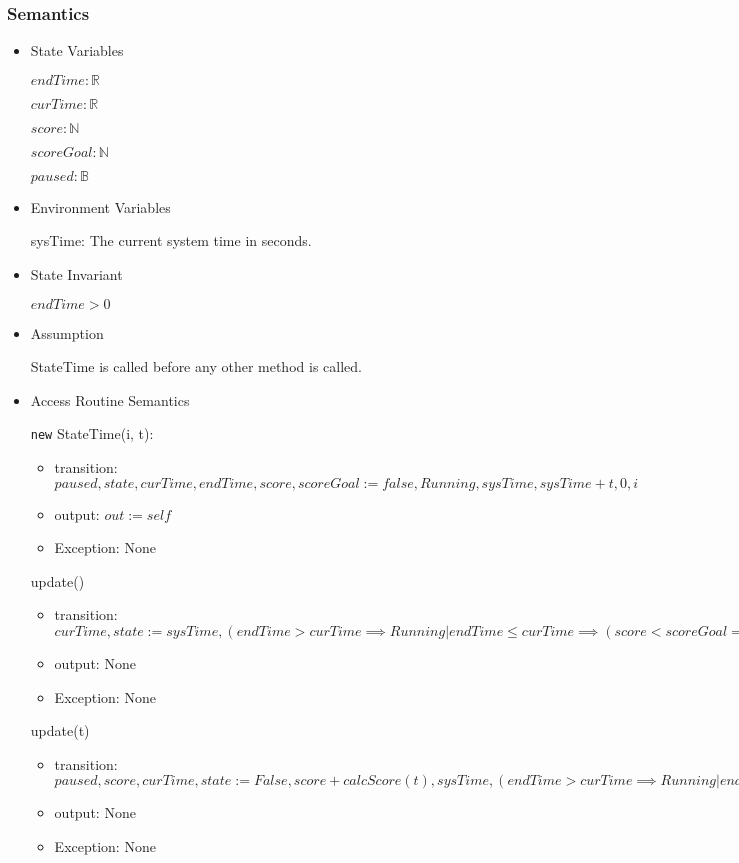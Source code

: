 \documentclass[11pt]{article}
\begin{document}
\subsubsection*{Semantics}
\label{sec:orgd4531b5}
\begin{itemize}
\item State Variables
\label{sec:orgf73b9cf}

\(endTime: \mathbb{R}\)

\(curTime: \mathbb{R}\)

\(score: \mathbb{N}\)

\(scoreGoal: \mathbb{N}\)

\(paused: \mathbb{B}\)

\item Environment Variables
\label{sec:org39748f8}

sysTime: The current system time in seconds.

\item State Invariant
\label{sec:orgeca77b7}

\(endTime > 0\)

\item Assumption
\label{sec:org350591d}

StateTime is called before any other method is called.

\item Access Routine Semantics
\label{sec:orgb076339}

\texttt{new} StateTime(i, t):
\begin{itemize}
\item transition: \(paused, state, curTime, endTime, score, scoreGoal := false, Running, sysTime, sysTime + t, 0, i\)
\item output: \(out := self\)
\item Exception: None
\end{itemize}

update()
\begin{itemize}
\item transition: \(curTime, state := sysTime, (endTime > curTime \implies Running | endTime \leq curTime \implies (score < scoreGoal \implies Lose | True \implies Win))\)
\item output: None
\item Exception: None
\end{itemize}

update(t)
\begin{itemize}
\item transition: \(paused, score, curTime, state := False, score + calcScore(t), sysTime, (endTime > curTime \implies Running | endTime \leq curTime \implies (score < scoreGoal \implies Lose | True \implies Win))\)
\item output: None
\item Exception: None
\end{itemize}


\end{itemize}
\end{document}

